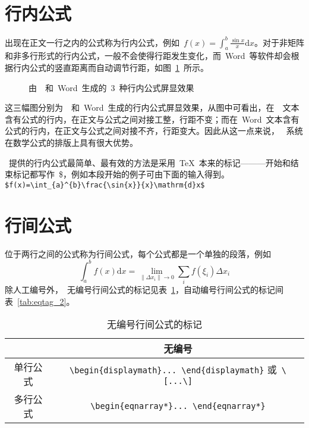 \section{行内公式}
出现在正文一行之内的公式称为行内公式，例如~$f(x)=\int_{a}^{b}\frac{\sin{x}}{x}\mathrm{d}x$。对于非矩阵和非多行形式的行内公式，一般不会使得行距发生变化，而~Word~等软件却会根据行内公式的竖直距离而自动调节行距，如图~\ref{fig:hangju}~所示。

\begin{figure}[htbp]
\centering
{}

\caption{由~\XeLaTeX~和~Word~生成的~3~种行内公式屏显效果}\label{fig:hangju}
\vspace{-1em}
\end{figure}

这三幅图分别为~\XeLaTeX~和~Word~生成的行内公式屏显效果，从图中可看出，在~\XeLaTeX~文本含有公式的行内，在正文与公式之间对接工整，行距不变；而在~Word~文本含有公式的行内，在正文与公式之间对接不齐，行距变大。因此从这一点来说，
\XeLaTeX~系统在数学公式的排版上具有很大优势。

\XeLaTeX~提供的行内公式最简单、最有效的方法是采用~\TeX~本来的标记———开始和结束标记都写作~\$，例如本段开始的例子可由下面的输入得到。
\verb|$f(x)=\int_{a}^{b}\frac{\sin{x}}{x}\mathrm{d}x$|

\section{行间公式}
位于两行之间的公式称为行间公式，每个公式都是一个单独的段落，例如
\[\int_a^b{f\left(x\right)\mathrm{d}x}=\lim_{\left\|\Delta{x_i}\right\|\to 0}\sum_i{f\left(\xi_i\right)\Delta{x_i}}\]
除人工编号外，\XeLaTeX~无编号行间公式的标记见表~\ref{tab:eqtag_1}，自动编号行间公式的标记间表~\ref{tab:eqtag_2}。
\begin{table}[htbp]
\caption{无编号行间公式的标记}\label{tab:eqtag_1}
\vspace{0.5em}\centering\wuhao
\begin{tabularx}{\textwidth}{cc}
\toprule
& 无编号\\
\midrule
单行公式 & \verb|\begin{displaymath}... \end{displaymath}| 或~\verb|\[...\]|\\
多行公式 & \verb|\begin{eqnarray*}... \end{eqnarray*}|\\
\bottomrule
\end{tabularx}
\end{table}

